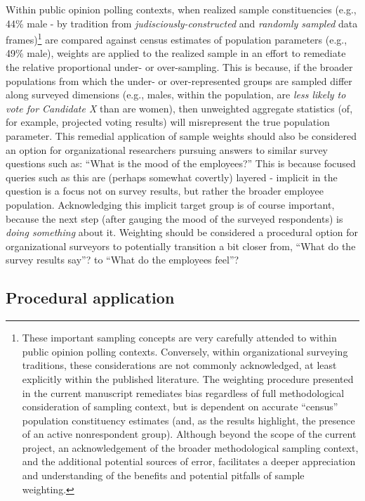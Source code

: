 \documentclass[
  man,mask]{apa7}
\begin{document}
Within public opinion polling contexts, when realized sample constituencies (e.g., 44\% male - by tradition from \emph{judisciously-constructed} and \emph{randomly sampled} data frames)\footnote{These important sampling concepts are very carefully attended to within public opinion polling contexts. Conversely, within organizational surveying traditions, these considerations are not commonly acknowledged, at least explicitly within the published literature. The weighting procedure presented in the current manuscript remediates bias regardless of full methodological consideration of sampling context, but is dependent on accurate ``census'' population constituency estimates (and, as the results highlight, the presence of an active nonrespondent group). Although beyond the scope of the current project, an acknowledgement of the broader methodological sampling context, and the additional potential sources of error, facilitates a deeper appreciation and understanding of the benefits and potential pitfalls of sample weighting.} are compared against census estimates of population parameters (e.g., 49\% male), weights are applied to the realized sample in an effort to remediate the relative proportional under- or over-sampling. This is because, if the broader populations from which the under- or over-represented groups are sampled differ along surveyed dimensions (e.g., males, within the population, are \emph{less likely to vote for Candidate X} than are women), then unweighted aggregate statistics (of, for example, projected voting results) will misrepresent the true population parameter. This remedial application of sample weights should also be considered an option for organizational researchers pursuing answers to similar survey questions such as: ``What is the mood of the employees?'' This is because focused queries such as this are (perhaps somewhat covertly) layered - implicit in the question is a focus not on survey results, but rather the broader employee population. Acknowledging this implicit target group is of course important, because the next step (after gauging the mood of the surveyed respondents) is \emph{doing something} about it. Weighting should be considered a procedural option for organizational surveyors to potentially transition a bit closer from, ``What do the survey results say''? to ``What do the employees feel''?

\hypertarget{procedural-application}{%
\subsection{Procedural application}\label{procedural-application}}
\end{document}
